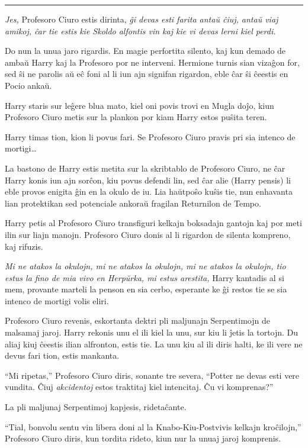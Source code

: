 \begin{center}\rule{3in}{0.4pt}\end{center}

\emph{Jes,} Profesoro Ciuro estis dirinta, \emph{ĝi devas esti farita
antaŭ ĉiuj, antaŭ viaj amikoj, ĉar tie estis kie Skoldo alfontis vin
kaj kie vi devas lerni kiel perdi.}

Do nun la unua jaro rigardis. En magie perfortita silento, kaj kun
demado de ambaŭ Harry kaj la Profesoro por ne interveni. Hermione
turnis sian vizaĝon for, sed ŝi ne parolis aŭ eĉ foni al li iun ajn
signifan rigardon, eble ĉar ŝi ĉeestis en Pocio ankaŭ.

Harry staris sur leĝere blua mato, kiel oni povis trovi en Mugla doĵo,
kiun Profesoro Ciuro metis sur la plankon por kiam Harry estos puŝita
teren.

Harry timas tion, kion li povus fari. Se Profesoro Ciuro pravis pri
sia intenco de mortigi\ldots

La bastono de Harry estis metita sur la skribtablo de Profesoro Ciuro,
ne ĉar Harry konis iun ajn sorĉon, kiu povus defendi lin, sed ĉar alie
(Harry pensis) li eble provos enigita ĝin en la okulo de iu. Lia
haŭtpoŝo kuŝis tie, nun enhavanta lian protektikan sed potenciale
ankoraŭ fragilan Returnilon de Tempo.

Harry petis al Profesoro Ciuro transfiguri kelkajn boksadajn gantojn
kaj por meti ilin sur liajn manojn. Profesoro Ciuro donis al li
rigardon de silenta kompreno, kaj rifuzis.

\emph{Mi ne atakos la okulojn, mi ne atakos la okulojn, mi ne atakos
la okulojn, tio estus la fino de mia vivo en Herpŭrka, mi estus
arestita,} Harry kantadis al si mem, provante marteli la penson en sia
cerbo, esperante ke ĝi restos tie se sia intenco de mortigi volis
eliri.

Profesoro Ciuro revenis, eskortanta dektri pli maljunajn Serpentimojn
de malsamaj jaroj. Harry rekonis unu el ili kiel la unu, sur kiu li
ĵetis la tortojn. Du aliaj kiuj ĉeestis ilian alfronton, estis tie. La
unu kiu al ili diris halti, ke ili vere ne devus fari tion, estis
mankanta.

``Mi ripetas,'' Profesoro Ciuro diris, sonante tre severa, ``Potter ne
devas esti vere vundita. Ĉiuj \emph{akcidentoj} estos traktitaj kiel
intencitaj. Ĉu vi komprenas?''

La pli maljunaj Serpentimoj kapjesis, ridetaĉante.

``Tial, bonvolu sentu vin libera doni al la Knabo-Kiu-Postvivis
kelkajn kroĉilojn,'' Profesoro Ciuro diris, kun tordita rideto, kiun nur
la unuaj jaroj komprenis.

